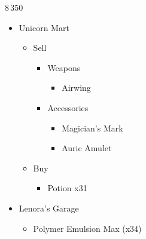 	\renewcommand{\first}{[1] Slash \& Burn (\com/\rav)}
	\renewcommand{\second}{[2] Tide Turner (\syn/\sab)}
	\renewcommand{\third}{[3] Divide \& Conquer (\com/\sab)}
	\renewcommand{\fourth}{[4] Dualcasting (\rav/\rav)}

	\begin{shop}{8\,350}
		\begin{itemize}
			\item Unicorn Mart
			      \begin{itemize}
				      \item Sell
				            \begin{itemize}
					            \item Weapons
					                  \begin{itemize}
						                  \item Airwing
					                  \end{itemize}
					            \item Accessories
					                  \begin{itemize}
						                  \item Magician's Mark
						                  \item Auric Amulet
					                  \end{itemize}
				            \end{itemize}
				      \item Buy
				            \begin{itemize}
					            \item Potion x31
				            \end{itemize}
			      \end{itemize}
			\item Lenora's Garage
			      \begin{itemize}
				      \item Polymer Emulsion Max (x34)
			      \end{itemize}
		\end{itemize}
	\end{shop}
